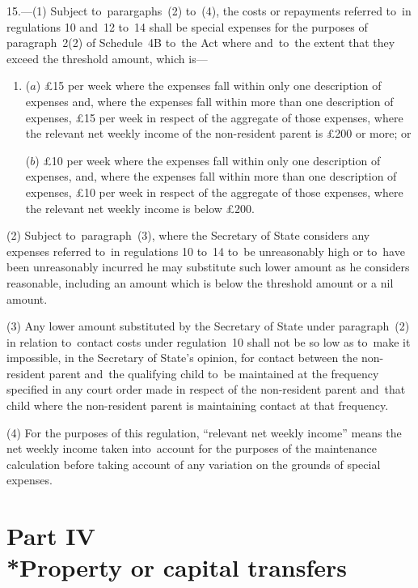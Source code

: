 \documentclass[12pt,a4paper]{article}
\begin{document}
15.---(1)  Subject to~parargaphs~(2) to~(4), the costs or repayments referred to~in regulations 10 and~12 to~14 shall be special expenses for the purposes of paragraph~2(2) of Schedule~4B to~the Act where and~to~the extent that they exceed the threshold amount, which is—
\begin{enumerate}\item[]
($a$) £15 per week where the expenses fall within only one description of expenses and, where the expenses fall within more than one description of expenses, £15 per week in respect of the aggregate of those expenses, where the relevant net weekly income of the non-resident parent is £200 or more; or

($b$) £10 per week where the expenses fall within only one description of expenses, and, where the expenses fall within more than one description of expenses, £10 per week in respect of the aggregate of those expenses, where the relevant net weekly income is below £200.
\end{enumerate}

(2) Subject to~paragraph~(3), where the Secretary of State considers any expenses referred to~in regulations 10 to~14 to~be unreasonably high or to~have been unreasonably incurred he may substitute such lower amount as he considers reasonable, including an amount which is below the threshold amount or a nil amount.

(3) Any lower amount substituted by the Secretary of State under paragraph~(2) in relation to~contact costs under regulation~10 shall not be so low as to~make it impossible, in the Secretary of State’s opinion, for contact between the non-resident parent and~the qualifying child to~be maintained at the frequency specified in any court order made in respect of the non-resident parent and~that child where the non-resident parent is maintaining contact at that frequency.

(4) For the purposes of this regulation, “relevant net weekly income” means the net weekly income taken into~account for the purposes of the maintenance calculation before taking account of any variation on the grounds of special expenses.

\section[Part IV --- Property or capital transfers]{Part IV\\*Property or capital transfers}

\renewcommand\parthead{--- Part IV}
\end{document}
